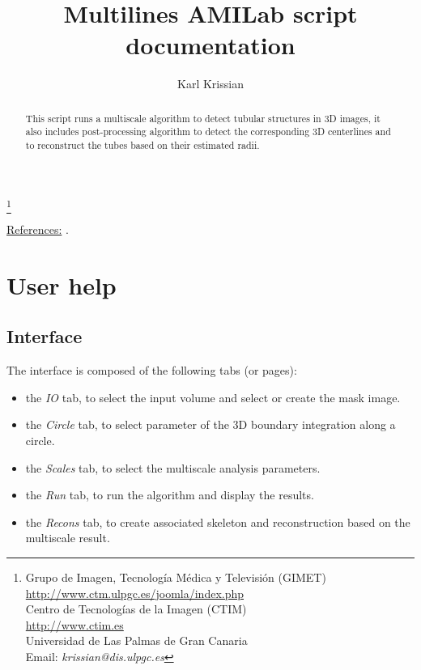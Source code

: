 \documentclass{article}
\begin{document}
\title{Multilines AMILab script documentation}
\author{ Karl Krissian
}
\thanks{Grupo de Imagen, Tecnolog\'ia M\'edica y Televisi\'on (GIMET)\\
\url{http://www.ctm.ulpgc.es/joomla/index.php}\\
Centro de Tecnolog\'ias de la Imagen (CTIM)\\
\url{http://www.ctim.es}\\
Universidad de Las Palmas de Gran Canaria\\
Email: {\it krissian@dis.ulpgc.es}
}


\maketitle


\begin{abstract}
This script runs a multiscale algorithm to detect tubular structures in 3D images, it also includes post-processing algorithm to detect the corresponding 3D centerlines and to reconstruct the tubes based on their estimated radii.
\end{abstract}

\underline{References:} \cite{Krissian2000b,Krissian_al_2003,KA09}.

\tableofchildlinks


\section{User help}

\subsection{Interface}
The interface is composed of the following tabs (or pages):
\begin{itemize}
 \item the {\em IO} tab, to select the input volume and select or create the mask image.
 \item the {\em Circle} tab, to select parameter of the 3D boundary integration along a circle.
 \item the {\em Scales} tab, to select the multiscale analysis parameters.
 \item the {\em Run} tab, to run the algorithm and display the results.
 \item the {\em Recons} tab, to create associated skeleton and reconstruction based on the multiscale result.
\end{itemize}
\end{document}
